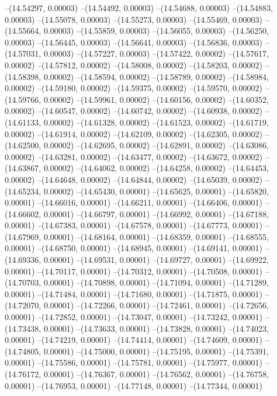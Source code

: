 --(14.54297, 0.00003)
--(14.54492, 0.00003)
--(14.54688, 0.00003)
--(14.54883, 0.00003)
--(14.55078, 0.00003)
--(14.55273, 0.00003)
--(14.55469, 0.00003)
--(14.55664, 0.00003)
--(14.55859, 0.00003)
--(14.56055, 0.00003)
--(14.56250, 0.00003)
--(14.56445, 0.00003)
--(14.56641, 0.00003)
--(14.56836, 0.00003)
--(14.57031, 0.00003)
--(14.57227, 0.00003)
--(14.57422, 0.00002)
--(14.57617, 0.00002)
--(14.57812, 0.00002)
--(14.58008, 0.00002)
--(14.58203, 0.00002)
--(14.58398, 0.00002)
--(14.58594, 0.00002)
--(14.58789, 0.00002)
--(14.58984, 0.00002)
--(14.59180, 0.00002)
--(14.59375, 0.00002)
--(14.59570, 0.00002)
--(14.59766, 0.00002)
--(14.59961, 0.00002)
--(14.60156, 0.00002)
--(14.60352, 0.00002)
--(14.60547, 0.00002)
--(14.60742, 0.00002)
--(14.60938, 0.00002)
--(14.61133, 0.00002)
--(14.61328, 0.00002)
--(14.61523, 0.00002)
--(14.61719, 0.00002)
--(14.61914, 0.00002)
--(14.62109, 0.00002)
--(14.62305, 0.00002)
--(14.62500, 0.00002)
--(14.62695, 0.00002)
--(14.62891, 0.00002)
--(14.63086, 0.00002)
--(14.63281, 0.00002)
--(14.63477, 0.00002)
--(14.63672, 0.00002)
--(14.63867, 0.00002)
--(14.64062, 0.00002)
--(14.64258, 0.00002)
--(14.64453, 0.00002)
--(14.64648, 0.00002)
--(14.64844, 0.00002)
--(14.65039, 0.00002)
--(14.65234, 0.00002)
--(14.65430, 0.00001)
--(14.65625, 0.00001)
--(14.65820, 0.00001)
--(14.66016, 0.00001)
--(14.66211, 0.00001)
--(14.66406, 0.00001)
--(14.66602, 0.00001)
--(14.66797, 0.00001)
--(14.66992, 0.00001)
--(14.67188, 0.00001)
--(14.67383, 0.00001)
--(14.67578, 0.00001)
--(14.67773, 0.00001)
--(14.67969, 0.00001)
--(14.68164, 0.00001)
--(14.68359, 0.00001)
--(14.68555, 0.00001)
--(14.68750, 0.00001)
--(14.68945, 0.00001)
--(14.69141, 0.00001)
--(14.69336, 0.00001)
--(14.69531, 0.00001)
--(14.69727, 0.00001)
--(14.69922, 0.00001)
--(14.70117, 0.00001)
--(14.70312, 0.00001)
--(14.70508, 0.00001)
--(14.70703, 0.00001)
--(14.70898, 0.00001)
--(14.71094, 0.00001)
--(14.71289, 0.00001)
--(14.71484, 0.00001)
--(14.71680, 0.00001)
--(14.71875, 0.00001)
--(14.72070, 0.00001)
--(14.72266, 0.00001)
--(14.72461, 0.00001)
--(14.72656, 0.00001)
--(14.72852, 0.00001)
--(14.73047, 0.00001)
--(14.73242, 0.00001)
--(14.73438, 0.00001)
--(14.73633, 0.00001)
--(14.73828, 0.00001)
--(14.74023, 0.00001)
--(14.74219, 0.00001)
--(14.74414, 0.00001)
--(14.74609, 0.00001)
--(14.74805, 0.00001)
--(14.75000, 0.00001)
--(14.75195, 0.00001)
--(14.75391, 0.00001)
--(14.75586, 0.00001)
--(14.75781, 0.00001)
--(14.75977, 0.00001)
--(14.76172, 0.00001)
--(14.76367, 0.00001)
--(14.76562, 0.00001)
--(14.76758, 0.00001)
--(14.76953, 0.00001)
--(14.77148, 0.00001)
--(14.77344, 0.00001)
